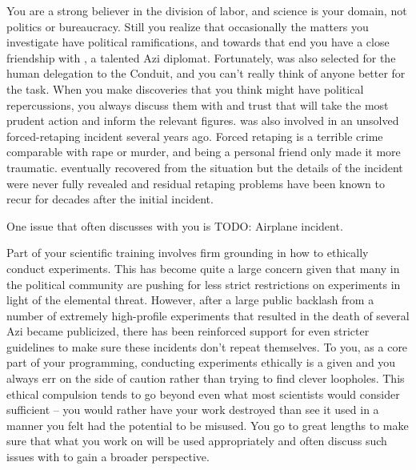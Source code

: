 \documentclass[char]{elementals}
\begin{document}
You are a strong believer in the division of labor, and science is your domain, not politics or bureaucracy. Still you realize that occasionally the matters you investigate have political ramifications, and towards that end you have a close friendship with \cDiplomat{\intro}, a talented Azi diplomat. Fortunately, \cDiplomat{} was also selected for the human delegation to the Conduit, and you can't really think of anyone better for the task. When you make discoveries that you think might have political repercussions, you always discuss them with \cDiplomat{} and trust that \cDiplomat{\they} will take the most prudent action and inform the relevant figures. \cDiplomat{} was also involved in an unsolved forced-retaping incident several years ago. Forced retaping is a terrible crime comparable with rape or murder, and \cDiplomat{} being a personal friend only made it more traumatic. \cDiplomat{} eventually recovered from the situation but the details of the incident were never fully revealed and residual retaping problems have been known to recur for decades after the initial incident.

One issue that \cDiplomat{} often discusses with you is
TODO: Airplane incident.

Part of your scientific training involves firm grounding in how to ethically conduct experiments. This has become quite a large concern given that many in the political community are pushing for less strict restrictions on experiments in light of the elemental threat. However, after a large public backlash from a number of extremely high-profile experiments that resulted in the death of several Azi became publicized, there has been reinforced support for even stricter guidelines to make sure these incidents don't repeat themselves. To you, as a core part of your programming, conducting experiments ethically is a given and you always err on the side of caution rather than trying to find clever loopholes. This ethical compulsion tends to go beyond even what most scientists would consider sufficient -- you would rather have your work destroyed than see it used in a manner you felt had the potential to be misused. You go to great lengths to make sure that what you work on will be used appropriately and often discuss such issues with \cDiplomat{} to gain a broader perspective.
\end{document}
